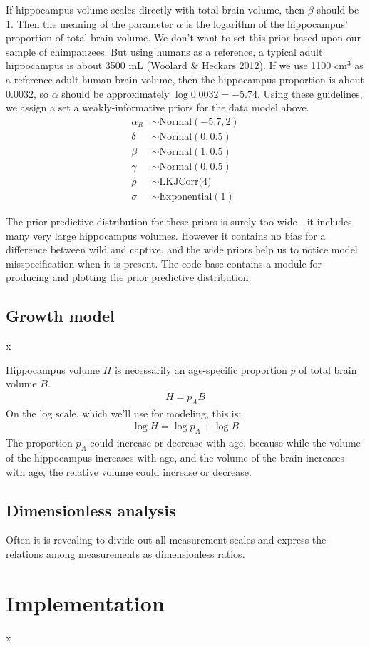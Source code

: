 \documentclass[reqno ,11pt]{amsart}
\begin{document}
If hippocampus volume scales directly with total brain volume, then $\beta$ should be 1. Then the meaning of the parameter $\alpha$ is the logarithm of the hippocampus' proportion of total brain volume. We don't want to set this prior based upon our sample of chimpanzees. But using humans as a reference, a typical adult hippocampus is about 3500 mL (Woolard \& Heckars 2012). If we use 1100 cm$^3$ as a reference adult human brain volume, then the hippocampus proportion is about $0.0032$, so $\alpha$ should be approximately $\log 0.0032 = -5.74$. Using these guidelines, we assign a set a weakly-informative priors for the data model above.
\begin{align*}
\alpha_{R} &\sim \text{Normal}(-5.7,2) \\
\delta &\sim \text{Normal}(0,0.5) \\
\beta &\sim \text{Normal}(1,0.5) \\
\gamma &\sim \text{Normal}(0,0.5) \\
\rho &\sim \text{LKJCorr(4)} \\
\sigma &\sim \text{Exponential}(1)
\end{align*}

The prior predictive distribution for these priors is surely too wide---it includes many very large hippocampus volumes. However it contains no bias for a difference between wild and captive, and the wide priors help us to notice model misspecification when it is present. The code base contains a module for producing and plotting the prior predictive distribution.


\subsection{Growth model}
x

Hippocampus volume $H$ is necessarily an age-specific proportion $p$ of total brain volume $B$.
\begin{align}
H = p_A B
\end{align}
On the log scale, which we'll use for modeling, this is:
\begin{align*}
\log H = \log p_A + \log B
\end{align*}
The proportion $p_A$ could increase or decrease with age, because while the volume of the hippocampus increases with age, and the volume of the brain increases with age, the relative volume could increase or decrease.


\subsection{Dimensionless analysis}

Often it is revealing to divide out all measurement scales and express the relations among measurements as dimensionless ratios.


\section{Implementation}

x


\clearpage
 

\end{document}
